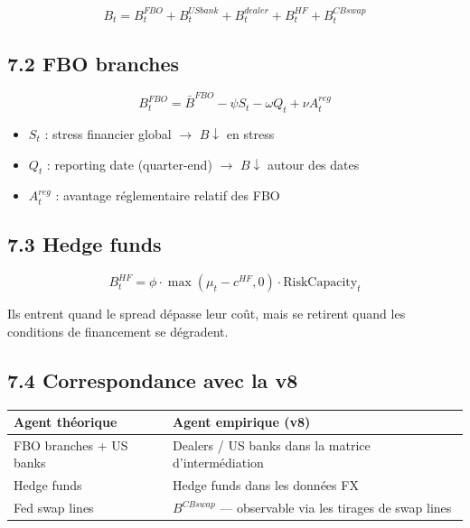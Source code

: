 \begin{equation}
B_t = B_t^{FBO} + B_t^{USbank} + B_t^{dealer} + B_t^{HF} + B_t^{CBswap}
\label{eq:capacity}
\end{equation}

\subsection*{7.2 FBO branches}

\begin{equation}
B_t^{FBO} = \bar{B}^{FBO} - \psi S_t - \omega Q_t + \nu A_t^{reg}
\label{eq:FBO}
\end{equation}

\begin{itemize}
  \item $S_t$ : stress financier global $\to$ $B \downarrow$ en stress
  \item $Q_t$ : reporting date (quarter-end) $\to$ $B \downarrow$ autour des dates
  \item $A_t^{reg}$ : avantage réglementaire relatif des FBO
\end{itemize}

\subsection*{7.3 Hedge funds}

\begin{equation}
B_t^{HF} = \phi \cdot \max(\mu_t - c^{HF}, 0) \cdot \text{RiskCapacity}_t
\label{eq:HF}
\end{equation}

Ils entrent quand le spread dépasse leur coût, mais se retirent
quand les conditions de financement se dégradent.

\subsection*{7.4 Correspondance avec la v8}

\begin{tabular}{ll}
\toprule
Agent théorique & Agent empirique (v8) \\
\midrule
FBO branches + US banks & Dealers / US banks dans la matrice d'intermédiation \\
Hedge funds & Hedge funds dans les données FX \\
Fed swap lines & $B^{CBswap}$ — observable via les tirages de swap lines \\
\bottomrule
\end{tabular}

